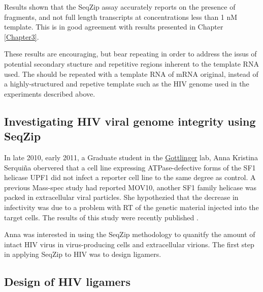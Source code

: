      Results shown that the SeqZip assay accurately reports on the presence of fragments, and not full length transcripts at concentrations less than 1 nM template. This is in good agreement with results presented in Chapter \ref{Chapter3}. 

     These results are encouraging, but bear repeating in order to address the issus of potential secondary stucture and repetitive regions inherent to the template RNA used. The should be repeated with a template RNA of mRNA original, instead of a highly-structured and repetive template such as the HIV genome used in the experiments described above.

  \subsection{Investigating HIV viral genome integrity using SeqZip}\label{subsec: HIV}

    In late 2010, early 2011, a Graduate student in the \href{http://profiles.umassmed.edu/profiles/display/133484}{Gottlinger} lab, Anna Kristina Serquiña obervered that a cell line expressing ATPase-defective forms of the SF1 helicase UPF1 \citep{Bhattacharya2000} did not infect a reporter cell line to the same degree as control. A previous Mass-spec study had reported MOV10, another SF1 family helicase \citep{Gregersen2014} was packed in extracellular viral particles. She hypothezied that the decrease in infectivity was due to a problem with RT of the genetic material injected into the target cells. The results of this study were recently published \citep{Serquina2013a}.

    Anna was interested in using the SeqZip methodology to quanitfy the amount of intact HIV virus in virus-producing cells and extracellular virions. The first step in applying SeqZip to HIV was to design ligamers.

	\subsection{Design of HIV ligamers}

